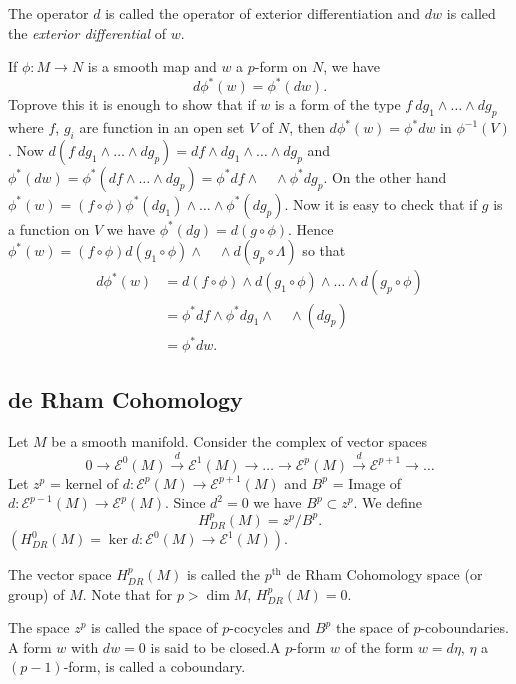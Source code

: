 The operator $d$ is called the operator of exterior differentiation and $dw$ is called the {\em exterior differential} of $w$.

If $\phi:M\to N$ is a smooth map and $w$ a $p$-form on $N$, we have
$$
d\phi^{*}(w)=\phi^{*}(dw).
$$
To\pageoriginale prove this it is enough to show that if $w$ is a form of the type $f \ dg_{1}\wedge\ldots\wedge dg_{p}$ where $f$, $g_{i}$ are function in an open set $V$ of $N$, then $d\phi^{*}(w)=\phi^{*}dw$ in $\phi^{-1}(V)$. Now $d(f\ dg_{1}\wedge\ldots\wedge dg_{p})=df\wedge dg_{1}\wedge\ldots\wedge dg_{p}$ and $\phi^{*}(dw)=\phi^{*}(df\wedge\ldots\wedge dg_{p})=\phi^{*}df\wedge\quad\wedge \phi^{*}dg_{p}$. On the other hand $\phi^{*}(w)=(f\circ \phi)\phi^{*}(dg_{1})\wedge\ldots\wedge \phi^{*}(dg_{p})$. Now it is easy to check that if $g$ is a function on $V$ we have $\phi^{*}(dg)=d(g\circ \phi)$. Hence $\phi^{*}(w)=(f\circ \phi)d(g_{1}\circ\phi)\wedge\quad\wedge d(g_{p}\circ \Lambda)$ so that
\begin{align*}
d\phi^{*}(w) &= d(f\circ\phi)\wedge d(g_{1}\circ\phi)\wedge\ldots\wedge d(g_{p}\circ\phi)\\[3pt]
            &= \phi^{*}df\wedge \phi^{*}dg_{1}\wedge\quad\wedge (dg_{p})\\[3pt]
            &= \phi^{*}dw.
\end{align*}

\subsection*{de Rham Cohomology}

Let $M$ be a smooth manifold. Consider the complex of vector spaces
$$
0\to \mathscr{E}^{0}(M)\xrightarrow{d}\mathscr{E}^{1}(M)\to\ldots\to \mathscr{E}^{p}(M)\xrightarrow{d}\mathscr{E}^{p+1}\to \ldots
$$
Let $z^{p}$ = kernel of $d:\mathscr{E}^{p}(M)\to \mathscr{E}^{p+1}(M)$ and $B^{p}$ = Image of $d:\mathscr{E}^{p-1}(M)\to \mathscr{E}^{p}(M)$. Since $d^{2}=0$ we have $B^{p}\subset z^{p}$. We define
$$
H^{p}_{DR}(M)=z^{p}/B^{p}.
$$
$(H^{0}_{DR}(M)=\ker d:\mathscr{E}^{0}(M)\to \mathscr{E}^{1}(M))$.

The vector space $H^{p}_{DR}(M)$ is called the $p^{\text{th}}$ de Rham Cohomology space (or group) of $M$. Note that for $p>\dim M$, $H^{p}_{DR}(M)=0$.

The space $z^{p}$ is called the space of $p$-cocycles and $B^{p}$ the space of $p$-coboundaries. A form $w$ with $dw=0$ is said to be closed.\pageoriginale A $p$-form $w$ of the form $w=d\eta$, $\eta$ a $(p-1)$-form, is called a coboundary.

